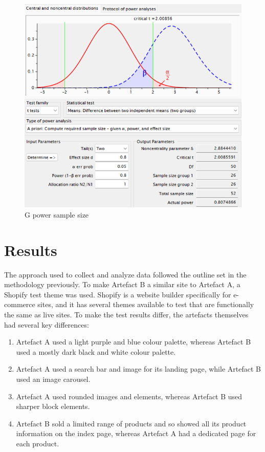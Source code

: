 \documentclass[article]{IEEEtran}
\begin{document}
            \clearpage
            
            \begin{figure}
                \caption{G power sample size}
                \includegraphics[width=\columnwidth]{images/data/sample-size.png}
            \end{figure}
            
    \section{Results}
        The approach used to collect and analyze data followed the outline set in the methodology previously. To make Artefact B a similar site to Artefact A, a Shopify test theme was used. Shopify is a website builder specifically for e-commerce sites, and it has several themes available to test that are functionally the same as live sites. To make the test results differ, the artefacts themselves had several key differences:
        
        \begin{enumerate}
            \item Artefact A used a light purple and blue colour palette, whereas Artefact B used a mostly dark black and white colour palette.
            \item Artefact A used a search bar and image for its landing page, while Artefact B used an image carousel.
            \item Artefact A used rounded images and elements, whereas Artefact B used sharper block elements.
            \item Artefact B sold a limited range of products and so showed all its product information on the index page, whereas Artefact A had a dedicated page for each product.
        \end{enumerate}
\end{document}
